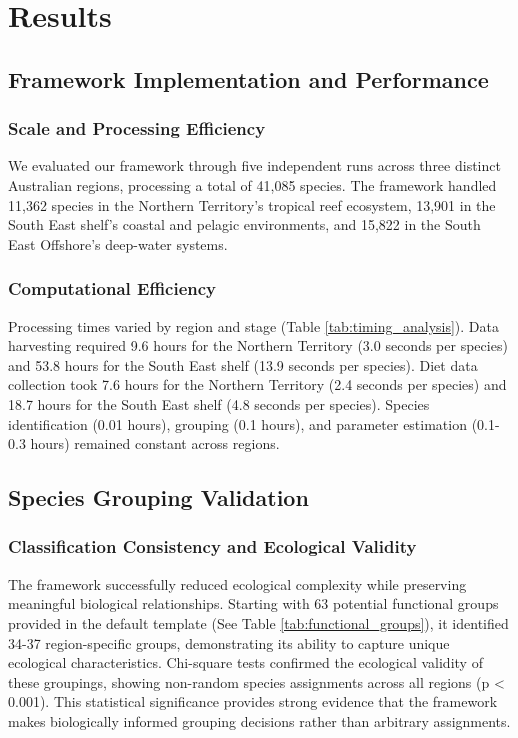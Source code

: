 \section{Results}

\subsection{Framework Implementation and Performance}

\subsubsection{Scale and Processing Efficiency}
We evaluated our framework through five independent runs across three distinct Australian regions, processing a total of 41,085 species. The framework handled 11,362 species in the Northern Territory's tropical reef ecosystem, 13,901 in the South East shelf's coastal and pelagic environments, and 15,822 in the South East Offshore's deep-water systems. 

\subsubsection{Computational Efficiency}



Processing times varied by region and stage (Table \ref{tab:timing_analysis}). Data harvesting required 9.6 hours for the Northern Territory (3.0 seconds per species) and 53.8 hours for the South East shelf (13.9 seconds per species). Diet data collection took 7.6 hours for the Northern Territory (2.4 seconds per species) and 18.7 hours for the South East shelf (4.8 seconds per species). Species identification (0.01 hours), grouping (0.1 hours), and parameter estimation (0.1-0.3 hours) remained constant across regions.

\subsection{Species Grouping Validation}

\subsubsection{Classification Consistency and Ecological Validity}
The framework successfully reduced ecological complexity while preserving meaningful biological relationships. Starting with 63 potential functional groups provided in the default template (See Table \ref{tab:functional_groups}), it identified 34-37 region-specific groups, demonstrating its ability to capture unique ecological characteristics. Chi-square tests confirmed the ecological validity of these groupings, showing non-random species assignments across all regions (p < 0.001). This statistical significance provides strong evidence that the framework makes biologically informed grouping decisions rather than arbitrary assignments.

